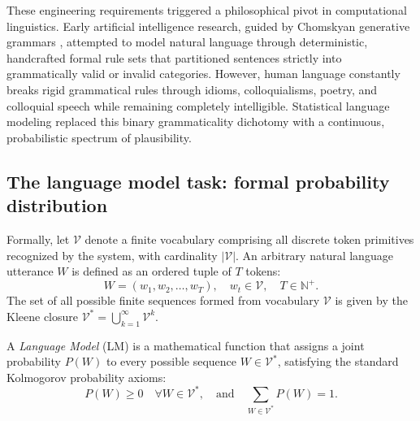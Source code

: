 \documentclass[../../main.tex]{subfiles}
\begin{document}
These engineering requirements triggered a philosophical pivot in computational linguistics. Early artificial intelligence research, guided by Chomskyan generative grammars \citep{manning1999}, attempted to model natural language through deterministic, handcrafted formal rule sets that partitioned sentences strictly into grammatically valid or invalid categories. However, human language constantly breaks rigid grammatical rules through idioms, colloquialisms, poetry, and colloquial speech while remaining completely intelligible. Statistical language modeling replaced this binary grammaticality dichotomy with a continuous, probabilistic spectrum of plausibility.

\subsection{The language model task: formal probability distribution}
\label{subsec:lm_formal_distribution}

Formally, let $\mathcal{V}$ denote a finite vocabulary comprising all discrete token primitives recognized by the system, with cardinality $|\mathcal{V}|$. An arbitrary natural language utterance $W$ is defined as an ordered tuple of $T$ tokens:
\begin{equation}
W = \left(w_1, w_2, \dots, w_T\right), \quad w_t \in \mathcal{V}, \quad T \in \mathbb{N}^+.
\end{equation}
The set of all possible finite sequences formed from vocabulary $\mathcal{V}$ is given by the Kleene closure $\mathcal{V}^* = \bigcup_{k=1}^\infty \mathcal{V}^k$.

A \textit{Language Model} (LM) is a mathematical function that assigns a joint probability $P(W)$ to every possible sequence $W \in \mathcal{V}^*$, satisfying the standard Kolmogorov probability axioms:
\begin{equation}
P(W) \ge 0 \quad \forall W \in \mathcal{V}^*, \quad \text{and} \quad \sum_{W \in \mathcal{V}^*} P(W) = 1.
\label{eq:kolmogorov_lm}
\end{equation}
\end{document}

